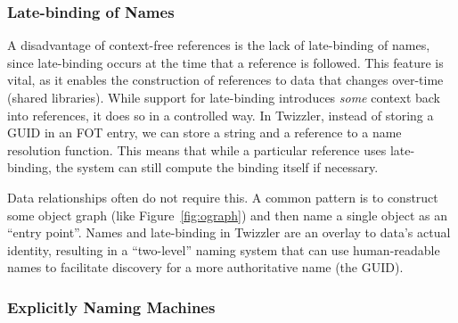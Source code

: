 {    %


    \subsubsection{Late-binding of Names}
    \label{sec:latebinding}

    A disadvantage of context-free references is the lack of late-binding of names,
    since late-binding occurs at the time that a reference is followed. This feature
    is vital, as it enables the construction of references to data that changes
    over-time (\eg shared libraries). While support for late-binding
    introduces \emph{some} context back into references, it does so in a controlled way. In Twizzler,
    instead of storing a GUID in an FOT entry, we can store a string and a reference
    to a name resolution function.
    This means
    that while a particular reference uses late-binding, the system can still compute the binding itself
    if necessary.

    Data relationships often do not require this.
    A common pattern is to construct some object graph (like
    Figure~\ref{fig:ograph}) and then name a single object as an ``entry point''.
    Names and late-binding in Twizzler are an overlay to data's actual
    identity, resulting in a ``two-level'' naming system that can use human-readable names to facilitate
    discovery for a more authoritative name (the GUID).




    \subsubsection{Explicitly Naming Machines}
    \label{sec:name_machines}

}
